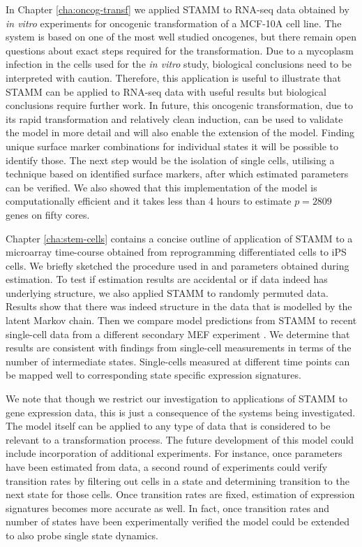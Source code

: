 In Chapter \ref{cha:oncog-transf} we applied STAMM to RNA-seq data obtained by {\it in vitro} experiments for oncogenic transformation of a MCF-10A cell line. The system is based on one of the most well studied oncogenes, but there remain open questions about exact steps required for the transformation. Due to a mycoplasm infection in the cells used for the {\it in vitro} study, biological conclusions need to be interpreted with caution. Therefore, this application is useful to illustrate that STAMM can be applied to RNA-seq data with useful results but biological conclusions require further work. In future, this oncogenic transformation, due to its rapid transformation and relatively clean induction, can be used to validate the model in more detail and will also enable the extension of the model. Finding unique surface marker combinations for individual states it will be possible to identify those. The next step would be the isolation of single cells, utilising a technique based on identified surface markers, after which estimated parameters can be verified. We also showed that this implementation of the model is computationally efficient and it takes less than $4$ hours to estimate $p=2809$ genes on fifty cores.

Chapter \ref{cha:stem-cells} contains a concise outline of application of STAMM to a microarray time-course obtained from reprogramming differentiated cells to iPS cells. We briefly sketched the procedure used in \cite{Armond:2013} and parameters obtained during estimation. To test if estimation results are accidental or if data indeed has underlying structure, we also applied STAMM to randomly permuted data. Results show that there was indeed structure in the data that is modelled by the latent Markov chain. Then we compare model predictions from STAMM to recent single-cell data from a different secondary MEF experiment \citep{Buganim:2012hp}. We determine that results are consistent with findings from single-cell measurements in terms of the number of intermediate states. Single-cells measured at different time points can be mapped well to corresponding state specific expression signatures.

We note that though we restrict our investigation to applications of STAMM to gene expression data, this is just a consequence of the systems being investigated. The model itself can be applied to any type of data that is considered to be relevant to a transformation process. The future development of this model could include incorporation of additional experiments. For instance, once parameters have been estimated from data, a second round of experiments could verify transition rates by filtering out cells in a state and determining transition to the next state for those cells. Once transition rates are fixed, estimation of expression signatures becomes more accurate as well. In fact, once transition rates and number of states have been experimentally verified the model could be extended to also probe single state dynamics.

